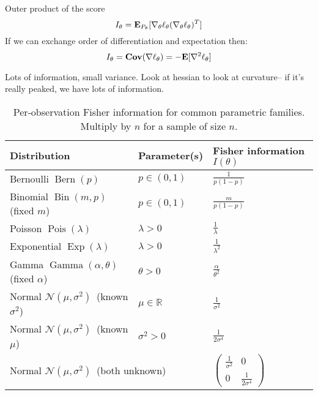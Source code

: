 \documentclass{article}
\begin{document}
\begin{definition}
Outer product of the score
$$I_\theta = \mathbf{E}_{P_\theta} [\nabla_\theta \ell_\theta (\nabla_\theta \ell_\theta)^T]$$
If we can exchange order of differentiation and expectation then:
$$I_\theta = \mathbf{Cov} (\nabla \ell_\theta) = -\mathbf{E}[\nabla^2 \ell_\theta] $$
\end{definition}
Lots of information, small variance. Look at hessian to look at curvature-- if it's really peaked, we have lots of information. 
\begin{theorem}
\end{theorem}
\begin{table}[ht]
\centering
\begin{tabular}{|l|l|l|}
\hline
\textbf{Distribution} & \textbf{Parameter(s)} & \textbf{Fisher information $I(\theta)$} \\
\hline
Bernoulli $\operatorname{Bern}(p)$                         & $p\in(0,1)$              & $\displaystyle \frac{1}{p(1-p)}$ \\[4pt]
Binomial $\operatorname{Bin}(m,p)$ \,(fixed $m$)           & $p\in(0,1)$              & $\displaystyle \frac{m}{p(1-p)}$ \\[4pt]
Poisson $\operatorname{Pois}(\lambda)$                     & $\lambda>0$              & $\displaystyle \frac{1}{\lambda}$ \\[6pt]
Exponential $\operatorname{Exp}(\lambda)$                  & $\lambda>0$              & $\displaystyle \frac{1}{\lambda^{2}}$ \\[6pt]
Gamma $\operatorname{Gamma}(\alpha,\theta)$ \,(fixed $\alpha$) & $\theta>0$          & $\displaystyle \frac{\alpha}{\theta^{2}}$ \\[6pt]
Normal $\mathcal N(\mu,\sigma^{2})$ \,(known $\sigma^{2}$) & $\mu\in\mathbb R$        & $\displaystyle \frac{1}{\sigma^{2}}$ \\[8pt]
Normal $\mathcal N(\mu,\sigma^{2})$ \,(known $\mu$)        & $\sigma^{2}>0$           & $\displaystyle \frac{1}{2\sigma^{4}}$ \\[10pt]
\multicolumn{2}{|l|}{Normal $\mathcal N(\mu,\sigma^{2})$ \,(both unknown)}
  & $\displaystyle
    \begin{pmatrix}
      \frac{1}{\sigma^{2}} & 0 \\[6pt]
      0 & \frac{1}{2\sigma^{4}}
    \end{pmatrix}$ \\[10pt]
\hline
\end{tabular}
\caption{Per‐observation Fisher information for common parametric families.  
Multiply by $n$ for a sample of size $n$.}
\end{table}


\begin{definition}
\end{definition}
\end{document}
